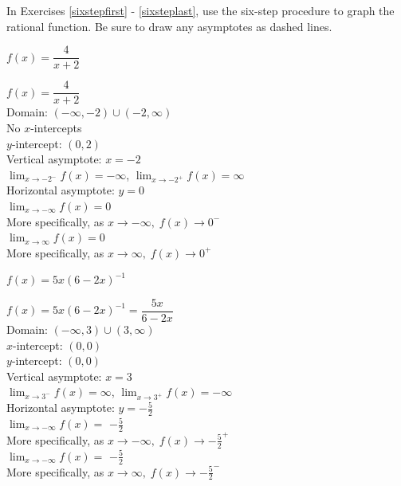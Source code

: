 \documentclass{ximera}
\begin{document}
\begin{question}
In Exercises \ref{sixstepfirst} - \ref{sixsteplast}, use the six-step procedure to graph the rational function. Be sure to draw any asymptotes
as dashed lines.


\begin{problem}\label{sixstepfirst}
$f(x) = \dfrac{4}{x + 2}$

\begin{solution}
$f(x) = \dfrac{4}{x + 2}$\\
Domain: $(-\infty, -2) \cup (-2, \infty)$\\
No $x$-intercepts\\
$y$-intercept: $(0, 2)$\\
Vertical asymptote: $x = -2$\\
$\lim_{x \rightarrow -2^{-}} f(x) = -\infty$, $\lim_{x \rightarrow -2^{+}} f(x) = \infty$\\
Horizontal asymptote: $y = 0$\\
$\lim_{x \rightarrow - \infty} f(x) = 0$\\
More specifically, as $x \rightarrow -\infty, \; f(x) \rightarrow 0^{-}$\\
$\lim_{x \rightarrow  \infty} f(x) = 0$\\
More specifically, as  $x \rightarrow \infty, \; f(x) \rightarrow 0^{+}$\\

\begin{center} 
\end{center}
\end{solution}
\end{problem}

\begin{problem}
$f(x) = 5x(6-2x)^{-1}$ 

\begin{solution}
$f(x) = 5x(6-2x)^{-1} = \dfrac{5x}{6 - 2x}$\\
Domain: $(-\infty, 3) \cup (3, \infty)$\\
$x$-intercept: $(0, 0)$\\
$y$-intercept: $(0, 0)$\\
Vertical asymptote: $x = 3$\\
$\lim_{x \rightarrow 3^{-}} f(x) = \infty$, $\lim_{x \rightarrow 3^{+}} f(x) = -\infty$\\
Horizontal asymptote: $y = -\frac{5}{2}$\\
$\lim_{x \rightarrow - \infty} f(x) =$ $-\frac{5}{2}$\\
More specifically, as $x \rightarrow -\infty, \; f(x) \rightarrow -\frac{5}{2}^{+}$\\
$\lim_{x \rightarrow -\infty} f(x) =$ $-\frac{5}{2}$\\
More specifically, as $x \rightarrow \infty, \; f(x) \rightarrow -\frac{5}{2}^{-}$\\


\end{solution}
\end{problem}
\end{question}
\end{document}
